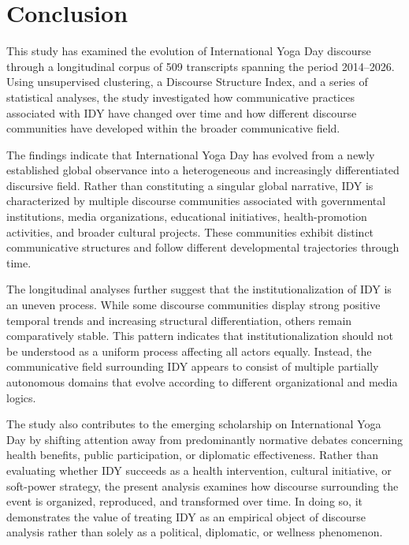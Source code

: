 \documentclass[11pt]{article}
\begin{document}
\section{Conclusion}



This study has examined the evolution of International Yoga Day discourse through a longitudinal corpus of 509
transcripts spanning the period 2014--2026. Using unsupervised clustering, a Discourse Structure Index, and a series of
statistical analyses, the study investigated how communicative practices associated with IDY have changed over time and
how different discourse communities have developed within the broader communicative field.


The findings indicate that International Yoga Day has evolved from a newly established global observance into a
heterogeneous and increasingly differentiated discursive field. Rather than constituting a singular global narrative,
IDY is characterized by multiple discourse communities associated with governmental institutions, media organizations,
educational initiatives, health-promotion activities, and broader cultural projects. These communities exhibit distinct
communicative structures and follow different developmental trajectories through time.


The longitudinal analyses further suggest that the institutionalization of IDY is an uneven process. While some
discourse communities display strong positive temporal trends and increasing structural differentiation, others remain
comparatively stable. This pattern indicates that institutionalization should not be understood as a uniform process
affecting all actors equally. Instead, the communicative field surrounding IDY appears to consist of multiple partially
autonomous domains that evolve according to different organizational and media logics.


The study also contributes to the emerging scholarship on International Yoga Day by shifting attention away from
predominantly normative debates concerning health benefits, public participation, or diplomatic effectiveness. Rather
than evaluating whether IDY succeeds as a health intervention, cultural initiative, or soft-power strategy, the present
analysis examines how discourse surrounding the event is organized, reproduced, and transformed over time. In doing so,
it demonstrates the value of treating IDY as an empirical object of discourse analysis rather than solely as a
political, diplomatic, or wellness phenomenon.
\end{document}
